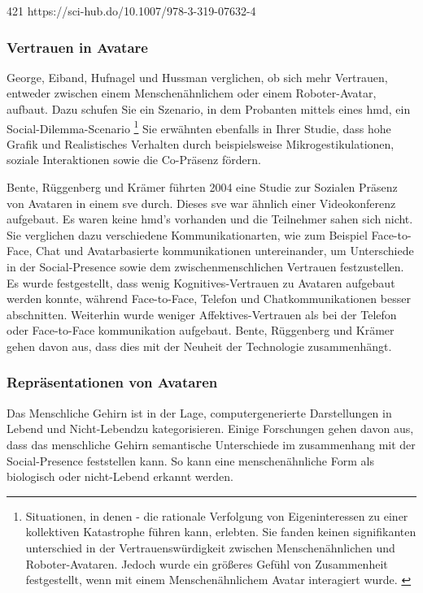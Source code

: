 \documentclass[a4paper,11pt]{article}%
\renewcommand{\\}{\vspace*{0.5\baselineskip} \newline}
\begin{document}
421
https://sci-hub.do/10.1007/978-3-319-07632-4 


\subsubsection{Vertrauen in Avatare}
			
George, Eiband, Hufnagel und Hussman verglichen, ob sich mehr Vertrauen, entweder zwischen einem Menschenähnlichem oder einem Roboter-Avatar, aufbaut. Dazu schufen Sie ein Szenario, in dem Probanten mittels eines \ac{hmd}, ein Social-Dilemma-Scenario  \footnote{Situationen, in denen - die rationale Verfolgung von Eigeninteressen zu einer kollektiven Katastrophe führen kann, erlebten. Sie fanden keinen signifikanten unterschied in der Vertrauenswürdigkeit zwischen Menschenähnlichen und Roboter-Avataren. Jedoch wurde ein größeres Gefühl von Zusammenheit festgestellt, wenn mit einem Menschenähnlichem Avatar interagiert wurde. \citep{kerr1983motivation}}
Sie erwähnten ebenfalls in Ihrer Studie, dass hohe Grafik und Realistisches Verhalten durch beispielsweise Mikrogestikulationen, soziale Interaktionen sowie die Co-Präsenz fördern. \citep{george2018trusting}

Bente, Rüggenberg und Krämer führten 2004 eine Studie zur Sozialen Präsenz von Avataren in einem \ac{sve} durch. Dieses \ac{sve} war ähnlich einer Videokonferenz aufgebaut. Es waren keine \ac{hmd}'s vorhanden und die Teilnehmer sahen sich nicht. Sie verglichen dazu verschiedene Kommunikationarten, wie zum Beispiel Face-to-Face, Chat und Avatarbasierte kommunikationen untereinander, um Unterschiede in der Social-Presence sowie dem zwischenmenschlichen Vertrauen festzustellen.
Es wurde festgestellt, dass wenig Kognitives-Vertrauen zu Avataren aufgebaut werden konnte, während Face-to-Face, Telefon und Chatkommunikationen besser abschnitten. Weiterhin wurde weniger Affektives-Vertrauen als bei der Telefon oder Face-to-Face kommunikation aufgebaut.
Bente, Rüggenberg und Krämer gehen davon aus, dass dies mit der Neuheit der Technologie zusammenhängt. \citep[p.54-59]{bente2004social}
			
\subsubsection{Repräsentationen von Avataren}

Das Menschliche Gehirn ist in der Lage, computergenerierte Darstellungen in \flqq Lebend und Nicht-Lebend\frqq zu kategorisieren. Einige Forschungen gehen davon aus, dass das menschliche Gehirn semantische Unterschiede im zusammenhang mit der Social-Presence feststellen kann. So kann eine menschenähnliche Form als biologisch oder nicht-Lebend erkannt werden. 
\end{document}
